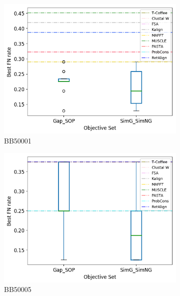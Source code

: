 \begin{figure}[!htbp]
\begin{adjustwidth}{-1cm}{-1cm}
		\begin{subfigure}{0.22\textwidth}
			\includegraphics[width=\columnwidth]{Figure/summary/precomputedInit/Balibase/BB50001_objset_fnrate_rank}
			\caption{BB50001}
		\end{subfigure}
		\begin{subfigure}{0.22\textwidth}
			\includegraphics[width=\columnwidth]{Figure/summary/precomputedInit/Balibase/BB50005_objset_fnrate_rank}
			\caption{BB50005}
		\end{subfigure}		
		\begin{subfigure}{0.22\textwidth}

\end{subfigure}
\end{adjustwidth}
\end{figure}
